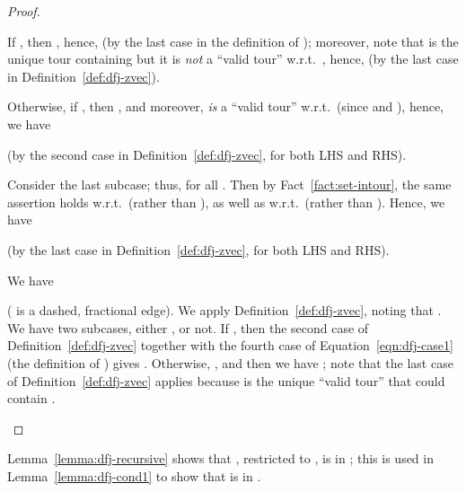 \documentclass[11pt]{article}
\begin{document}
\begin{proof}
\begin{description}
{\begin{description}
{\begin{description}
{\begin{description}{
\item[Subcase~3.2.1.1.]
If , then ,
hence, 
(by the last case in the definition of );
moreover, note that  is the unique tour containing 
but it is \emph{not} a ``valid tour'' w.r.t.\ ,
hence, 
(by the last case in Definition~\ref{def:dfj-zvec}).

\item[Subcase~3.2.1.2.]
Otherwise, if , then
, and moreover,
 \emph{is} a ``valid tour'' w.r.t.\ 
(since  and ),
hence, we have

(by the second case in Definition~\ref{def:dfj-zvec},
for both LHS and RHS).
}\end{description}

\item[Subcase~3.2.2.]
Consider the last subcase;
thus,  for all .
Then by Fact~\ref{fact:set-intour}, the same assertion
holds w.r.t.\  (rather than ),
as well as w.r.t.\  (rather than ).
Hence, we have

(by the last case in Definition~\ref{def:dfj-zvec},
for both LHS and RHS).
}\end{description}
} \end{description}

\item[Case~4.]
We have

{( is a dashed, fractional edge)}.
We apply Definition~\ref{def:dfj-zvec}, noting that
.
We have two subcases, either
, or not.
If , then the second case of
Definition~\ref{def:dfj-zvec}
together with the fourth case of Equation~\eqref{eqn:dfj-case1}
(the definition of ) gives
.
Otherwise, , and then we have
;
note that the last case of Definition~\ref{def:dfj-zvec}
applies because  is
the unique ``valid tour'' that could contain .
}\end{description}
\end{proof}


Lemma~\ref{lemma:dfj-recursive} shows that ,
restricted to ,
is in ;
this is used in Lemma~\ref{lemma:dfj-cond1} to show that 
is in .
\end{document}

